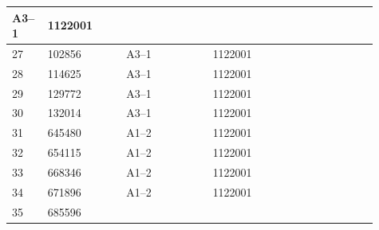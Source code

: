 \documentclass[UTF8,10pt,a4paper,fontset=fandol]{ctexart}
\newcommand{\fieldvalue}[1]{#1}
\begin{document}
\begin{tabular}{|p{0.07\linewidth}|p{0.20\linewidth}|p{0.22\linewidth}|p{0.24\linewidth}|p{0.18\linewidth}|}
\fieldvalue{A3--1} &
\fieldvalue{1122001} & \\
\hline
27 &
\fieldvalue{102856} &
\fieldvalue{A3--1} &
\fieldvalue{1122001} & \\
\hline
28 &
\fieldvalue{114625} &
\fieldvalue{A3--1} &
\fieldvalue{1122001} & \\
\hline
29 &
\fieldvalue{129772} &
\fieldvalue{A3--1} &
\fieldvalue{1122001} & \\
\hline
30 &
\fieldvalue{132014} &
\fieldvalue{A3--1} &
\fieldvalue{1122001} & \\
\hline
31 &
\fieldvalue{645480} &
\fieldvalue{A1--2} &
\fieldvalue{1122001} & \\
\hline
32 &
\fieldvalue{654115} &
\fieldvalue{A1--2} &
\fieldvalue{1122001} & \\
\hline
33 &
\fieldvalue{668346} &
\fieldvalue{A1--2} &
\fieldvalue{1122001} & \\
\hline
34 &
\fieldvalue{671896} &
\fieldvalue{A1--2} &
\fieldvalue{1122001} & \\
\hline
35 &
\fieldvalue{685596} &

\end{tabular}
\end{document}
